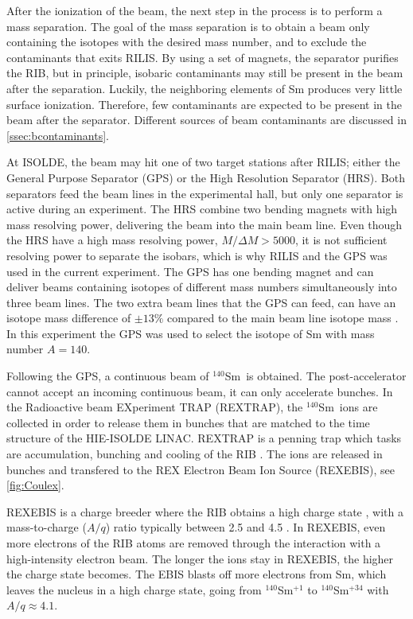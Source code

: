 \documentclass[twoside,english]{uiofysmaster/uiofysmaster}
\newcommand{\Sm}{$^{140}$Sm} %
\let\orgautoref\autoref
\renewcommand{\autoref}
        {%
		 \def\sectionautorefname{Section}%
		 \def\subsectionautorefname{Section}%
		 \def\subsubsectionautorefname{Section}%
		 \def\chapterautorefname{Chapter}%
          \orgautoref}
\begin{document}
After the ionization of the beam, the next step in the process is to perform a mass separation.
The goal of the mass separation is to obtain a beam only containing the isotopes with the desired mass number, and to exclude the contaminants that exits RILIS. 
By using a set of magnets, the separator purifies the RIB, but in principle, isobaric contaminants may still be present in the beam after the separation. 
Luckily, the neighboring elements of Sm produces very little surface ionization. 
Therefore, few contaminants are expected to be present in the beam after the separator. 
Different sources of beam contaminants are discussed in \autoref{ssec:bcontaminants}.

At ISOLDE, the beam may hit one of two target stations after RILIS; either the General Purpose Separator (GPS) or the High Resolution Separator (HRS). 
Both separators feed the beam lines in the experimental hall, but only one separator is active during an experiment. 
The HRS combine two bending magnets with high mass resolving power, delivering the beam into the main beam line. 
Even though the HRS have a high mass resolving power, $M/\Delta M > 5000$, it is not sufficient resolving power to separate the isobars, which is why RILIS and the GPS was used in the current experiment.
The GPS has one bending magnet and can deliver beams containing isotopes of different mass numbers simultaneously into three beam lines. 
The two extra beam lines that the GPS can feed, can have an isotope mass difference of $\pm 13 \%$ compared to the main beam line isotope mass \cite{GPS, TIF}.
In this experiment the GPS was used to select the isotope of Sm with mass number $A = 140$. 

Following the GPS, a continuous beam of \Sm\ is obtained. 
The post-accelerator cannot accept an incoming continuous beam, it can only accelerate bunches.
In the Radioactive beam EXperiment TRAP (REXTRAP), the \Sm\ ions are collected in order to release them in bunches that are matched to the time structure of the HIE-ISOLDE LINAC. 
REXTRAP is a penning trap which tasks are accumulation, bunching and cooling of the RIB \cite{HIE-ISOLDE, REXTRAP1, REXTRAP2}. 
The ions are released in bunches and transfered to the REX Electron Beam Ion Source (REXEBIS), see \autoref{fig:Coulex}.

REXEBIS is a charge breeder where the RIB obtains a high charge state \cite{REXEBIS}, with a mass-to-charge ($A/q$) ratio typically between 2.5 and 4.5 \cite{Post-acc}.
In REXEBIS, even more electrons of the RIB atoms are removed through the interaction with a high-intensity electron beam. 
The longer the ions stay in REXEBIS, the higher the charge state becomes. 
The EBIS blasts off more electrons from Sm, which leaves the nucleus in a high charge state, going from \Sm$^{+1}$ to \Sm$^{+34}$ with $A/q \approx 4.1$. 
\end{document}
